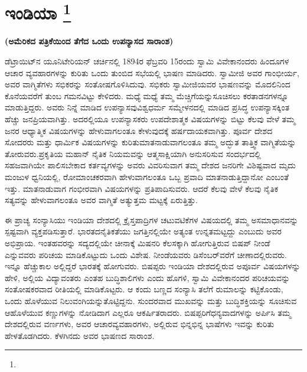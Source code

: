 
\chapter[ಇಂಡಿಯಾ ]{ಇಂಡಿಯಾ \protect\footnote{}}

\centerline{\textbf{(ಅಮೆರಿಕದ ಪತ್ರಿಕೆಯಿಂದ ತೆಗೆದ ಒಂದು ಉಪನ್ಯಾಸದ ಸಾರಾಂಶ)}}

ಡೆಟ್ರಾಯಿಟ್​ನ ಯೂನಿಟೇರಿಯನ್​ ಚರ್ಚಿನಲ್ಲಿ 1894ರ ಫೆಬ್ರವರಿ 15ರಂದು ಸ್ವಾಮಿ ವಿವೇಕಾನಂದರು ಹಿಂದೂಗಳ ಆಚಾರ ವ್ಯವಹಾರಗಳನ್ನು ಕುರಿತು ಒಂದು ತುಂಬಿದ ಸಭೆಯಲ್ಲಿ ಭಾಷಣ ಮಾಡಿದರು. ಸ್ವಾಮೀಜಿ ಅವರ ಗಾಂಭೀರ್ಯ, ಅವರ ವಾಗ್ಮಿತೆಗಳು ಸಭಿಕರನ್ನು ಸಂತೋಷಗೊಳಿಸಿದುವು. ಸಭಿಕರು ಸ್ವಾಮೀಜಿಯವರ ಭಾಷಣವನ್ನು ಮೊದಲಿನಿಂದ ಕೊನೆಯವರೆಗೆ ತುಂಬ ಗಮನವಿಟ್ಟು ಕೇಳಿದರು. ಮಧ್ಯೆ ಮಧ್ಯೆ ತಮ್ಮ ಮೆಚ್ಚಿಗೆಯನ್ನು\break ಸೂಚಿಸಲು ಕರತಾಡನಗಳನ್ನೂ ಮಾಡುತ್ತಿದ್ದರು. ಅವರು ನಿನ್ನೆ ಮಾಡಿದ ಉಪನ್ಯಾಸವು\break ವಿಶ್ವಧರ್ಮ ಸಮ್ಮೇಳನದಲ್ಲಿ ಮಾಡಿದ ಪ್ರಸಿದ್ಧ ಉಪನ್ಯಾಸಕ್ಕಿಂತ ಹೆಚ್ಚು ಜನಪ್ರಿಯವಾಗಿತ್ತು. ಅದರಲ್ಲಿಯೂ ಉಪನ್ಯಾಸಕರು ಉಪದೇಶಾತ್ಮಕ ವಿಷಯಗಳನ್ನು ಬಿಟ್ಟು ಕೆಲವು ವೇಳೆ ತಮ್ಮ ಜನರ ಆಧ್ಯಾತ್ಮಿಕ ವಿಷಯಗಳನ್ನು ಹೇಳುವಾಗಲಂತೂ ಕೇಳುವುದಕ್ಕೆ ಹರ್ಷದಾಯಕ\break ವಾಗಿತ್ತು. ಪೂರ್ವ ದೇಶದ ಸೋದರರು ಮತ್ತು ಧಾರ್ಮಿಕ ವಿಷಯಗಳನ್ನು ಕುರಿತು\break ಮಾತನಾಡುವಾಗಲಂತೂ ತಮ್ಮ ಅದ್ಭುತ ತಾತ್ತ್ವಿಕ ವಾಗ್ಮಿತೆಯನ್ನು ತೋರುವರು.\break ಪ್ರಕೃತಿಯ ಮಹಾನ್​ ನೈತಿಕ ನಿಯಮವನ್ನು ಆತ್ಮಸಾಕ್ಷಿಯಾಗಿ ಅನುಸರಿಸುವ ಸಂದರ್ಭದಲ್ಲಿ ಸಹಜವಾಗಿಯೇ ಪಾಲಿಸಬೇಕಾದ ಕರ್ತವ್ಯಗಳನ್ನು ಅವರು ವಿವರಿಸುವಾಗ ತಮ್ಮ ದೇಶದ ಜನರಿಗೇ ವಿಶಿಷ್ಟವಾದ ಮೃದು ಮಂಜುಳ ಧ್ವನಿಯಲ್ಲಿ, ರೋಮಾಂಚಕರವಾಗಿ ಹೇಳುವಾಗಲಂತೂ ಒಬ್ಬ ಪ್ರವಾದಿ ಮಾತನಾಡುತ್ತಿದ್ದಾನೋ ಎಂಬಂತೆ ಇತ್ತು. ಮಾತನಾಡುವಾಗ ಗಂಭೀರವಾಗಿ ವಿಷಯಗಳನ್ನು ಪ್ರತಿಪಾದಿಸುವರು. ಆದರೆ ಕೆಲವು ವೇಳೆ ಕೆಲವು ನೈತಿಕ ಸತ್ಯವನ್ನು ಹೇಳುವಾಗಲಂತೂ ಅವರ ವಾಗ್ಮಿತೆ ಅತ್ಯುತ್ತಮ ಮಟ್ಟಕ್ಕೆ ಏರುತ್ತಿತ್ತು.

ಈ ಪ್ರಾಚ್ಯ ಸಂನ್ಯಾಸಿಯು ಇಂಡಿಯಾ ದೇಶದಲ್ಲಿ ಕ್ರೈಸ್ತಪಾದ್ರಿಗಳ ಚಟುವಟಿಕೆಗಳ ವಿಷಯದಲ್ಲಿ ತಮ್ಮ ಅಸಮಾಧಾನವನ್ನು ಸ್ಪಷ್ಟವಾಗಿ ವ್ಯಕ್ತಪಡಿಸುತ್ತಾರೆ. ಭಾರತದ\break ನೈತಿಕತೆಯು ಜಗತ್ತಿನಲ್ಲಿಯೇ ಅತ್ಯಂತ ಉನ್ನತಮಟ್ಟದ್ದು ಎಂಬುದು ಅವರ ಅಭಿಪ್ರಾಯ. ಇಂತಹವರನ್ನು ಸದ್ಯದಲ್ಲಿಯೇ ಚೀನಾಕ್ಕೆ ಮಿಷನರಿ ಕೆಲಸಕ್ಕಾಗಿ ಹೋಗುತ್ತಿರುವ ಬಿಷಪ್​ ನೀಂಡೆ ಎನ್ನುವವರು ಪರಿಚಯ ಮಾಡಿಕೊಟ್ಟುದು ಒಂದು ವಿಶೇಷ. ನೀಂಡೆಯವರು ಡಿಸೆಂಬರ್​ವರೆಗೆ ಚೀಣಾದಲ್ಲಿರುವರು. ಇನ್ನೂ ಹೆಚ್ಚುಕಾಲ ಅಲ್ಲಿದ್ದರೆ ಭಾರತಕ್ಕೆ ಹೋಗುವರು. ಬಿಷಪ್ಪರು ಇಂಡಿಯಾ ದೇಶದಲ್ಲಿರುವ ಅಪೂರ್ವ ವಿಷಯಗಳನ್ನು ಹೇಳಿ, ಅಲ್ಲಿಯ ವಿದ್ಯಾವಂತರು ಎಂತಹ ಬುದ್ಧಿಶಾಲಿಗಳು ಎಂದು ಹೊಗಳಿ, ಸ್ವಾಮಿ ವಿವೇಕಾನಂದರ ಪರಿಚಯವನ್ನು ಸಂತೋಷಕರವಾದ ರೀತಿಯಲ್ಲಿ ಮಾಡಿಕೊಟ್ಟರು. ಆ ಕಂದು ಬಣ್ಣದ ಸಂನ್ಯಾಸಿ ತಲೆಗೆ ರುಮಾಲನ್ನು ಕಟ್ಟಿಕೊಂಡು, ಒಂದು ಹೊಳೆಯುವ ನಿಲುವಂಗಿಯನ್ನು\break ತೊಟ್ಟಿದ್ದನು. ಸುಂದರವಾದ ಮುಖವನ್ನು ಮತ್ತು ಬುದ್ಧಿಶಕ್ತಿಯನ್ನು ಸೂಚಿಸುವ ಆ\break ಹೊಳೆಯುವ ಕಣ್ಣುಗಳನ್ನು ನೋಡಿದಾಗ ಎಲ್ಲರೂ ಆಕರ್ಷಿತರಾದರು. ಬಿಷಪ್ಪರಿಗೆ\break ಧನ್ಯವಾದಗಳನ್ನು ಅರ್ಪಿಸಿ ತಮ್ಮ ದೇಶದಲ್ಲಿರುವ ವರ್ಣಗಳು, ಅವರ ಆಚಾರ\break ವ್ಯವಹಾರಗಳು, ಅಲ್ಲಿರುವ ಭಿನ್ನಭಿನ್ನ ಭಾಷೆಗಳು ಇವನ್ನು ಕುರಿತು ಹೇಳತೊಡಗಿದರು. ಕೆಳಗಿನದು ಅವರ ಭಾಷಣದ ಸಾರಾಂಶ.

